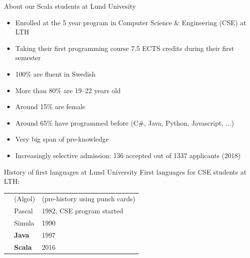\documentclass[aspectratio=169]{beamer}
\newenvironment{Slide}[1]%
  {\begin{frame}[environment=Slide]{#1}}
  {\end{frame}}%
\begin{document}
\begin{frame}[plain]
  \begin{figure}
  \centering
  \end{figure}%
  \end{frame}%

\begin{Slide}{About our Scala students at Lund Univesity}
\begin{itemize}
\item Enrolled at the 5 year program in Computer Science \& Engineering (CSE) at LTH
\item Taking their first programming course 7.5 ECTS credits during their first semester
\item 100\% are fluent in Swedish
\item More than 80\% are 19--22 years old
\item Around 15\% are female     
\item Around 65\% have programmed before (C\#, Java, Python, Javascript, ...)
\item Very big span of pre-knowledge
\item Increasingly selective admission: 136 accepted out of 1337 applicants (2018)
\end{itemize}
\end{Slide}

\begin{Slide}{History of first languages at Lund University}
First languages for CSE students at LTH:
\begin{table}
\begin{tabular}{l l l}
&(Algol) & (pre-history using punch cards) \\
& Pascal & 1982, CSE program started\\
& Simula &  1990 \\
& {\color{blue}\textbf{Java}} &  1997 \\
& {\color{red}\textbf{Scala}} &  2016 \\
\end{tabular}
\end{table}

\end{Slide}
\end{document}
